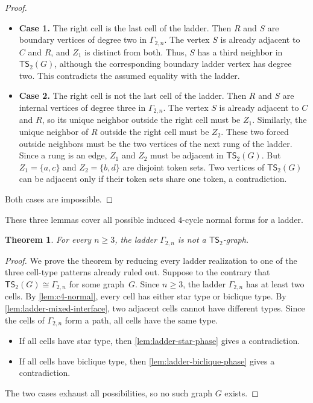 \documentclass[a4paper]{article}
\theoremstyle{plain}
\newtheorem{theorem}{Theorem}[section]
\theoremstyle{definition}
\newcommand{\TSsym}{\mathsf{TS}}
\numberwithin{equation}{section}
\begin{document}
\begin{proof}
\begin{itemize}
\item \textbf{Case 1.} The right cell is the last cell of the ladder.
Then $R$ and $S$ are boundary vertices of degree two in $\Gamma_{2,n}$.
The vertex $S$ is already adjacent to $C$ and $R$, and $Z_1$ is distinct from both.
Thus, $S$ has a third neighbor in $\TSsym_2(G)$, although the corresponding boundary ladder vertex has degree two.
This contradicts the assumed equality with the ladder.

\item \textbf{Case 2.} The right cell is not the last cell of the ladder.
Then $R$ and $S$ are internal vertices of degree three in $\Gamma_{2,n}$.
The vertex $S$ is already adjacent to $C$ and $R$, so its unique neighbor outside the right cell must be $Z_1$.
Similarly, the unique neighbor of $R$ outside the right cell must be $Z_2$.
These two forced outside neighbors must be the two vertices of the next rung of the ladder.
Since a rung is an edge, $Z_1$ and $Z_2$ must be adjacent in $\TSsym_2(G)$.
But $Z_1=\{a,c\}$ and $Z_2=\{b,d\}$ are disjoint token sets.
Two vertices of $\TSsym_2(G)$ can be adjacent only if their token sets share one token, a contradiction.
\end{itemize}

Both cases are impossible.
\end{proof}

These three lemmas cover all possible induced $4$-cycle normal forms for a ladder.

\begin{theorem}
\label{thm:no2n}
For every $n\ge 3$, the ladder $\Gamma_{2,n}$ is not a $\TSsym_2$-graph.
\end{theorem}

\begin{proof}
We prove the theorem by reducing every ladder realization to one of the three cell-type patterns already ruled out.
Suppose to the contrary that $\TSsym_2(G)\cong \Gamma_{2,n}$ for some graph~$G$.
Since $n\ge 3$, the ladder $\Gamma_{2,n}$ has at least two cells.
By \cref{lem:c4-normal}, every cell has either star type or biclique type.
By \cref{lem:ladder-mixed-interface}, two adjacent cells cannot have different types.
Since the cells of $\Gamma_{2,n}$ form a path, all cells have the same type.
\begin{itemize}
\item If all cells have star type, then \cref{lem:ladder-star-phase} gives a contradiction.

\item If all cells have biclique type, then \cref{lem:ladder-biclique-phase} gives a contradiction.
\end{itemize}
The two cases exhaust all possibilities, so no such graph $G$ exists.
\end{proof}
\end{document}
